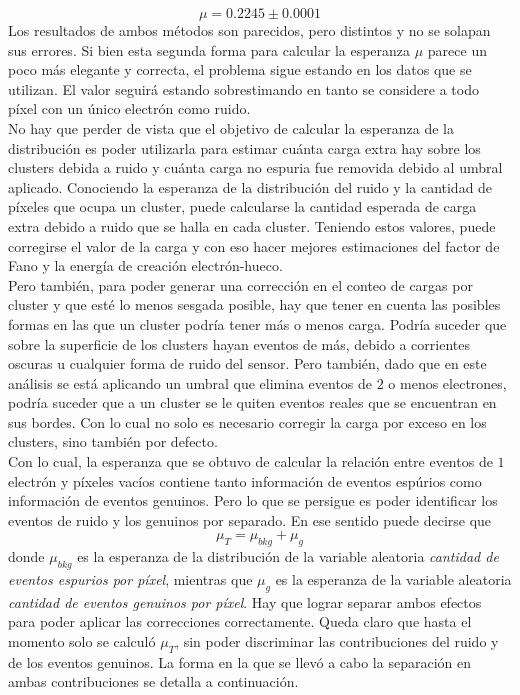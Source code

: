 \begin{equation*}
    \mu = 0.2245 \pm 0.0001
\end{equation*}
Los resultados de ambos métodos son parecidos, pero distintos y no se solapan sus errores. Si bien esta segunda forma para calcular la esperanza $\mu$ parece un poco más elegante y correcta, el problema sigue estando en los datos que se utilizan. El valor seguirá estando sobrestimando en tanto se considere a todo píxel con un único electrón como ruido.\\
\indent No hay que perder de vista que el objetivo de calcular la esperanza de la distribución es poder utilizarla para estimar cuánta carga extra hay sobre los clusters debida a ruido y cuánta carga no espuria fue removida debido al umbral aplicado. Conociendo la esperanza de la distribución del ruido y la cantidad de píxeles que ocupa un cluster, puede calcularse la cantidad esperada de carga extra debido a ruido que se halla en cada cluster. Teniendo estos valores, puede corregirse el valor de la carga y con eso hacer mejores estimaciones del factor de Fano y la energía de creación electrón-hueco.\\
\indent Pero también, para poder generar una corrección en el conteo de cargas por cluster y que esté lo menos sesgada posible, hay que tener en cuenta las posibles formas en las que un cluster podría tener más o menos carga. Podría suceder que sobre la superficie de los clusters hayan eventos de más, debido a corrientes oscuras u cualquier forma de ruido del sensor. Pero también, dado que en este análisis se está aplicando un umbral que elimina eventos de $2$ o menos electrones, podría suceder que a un cluster se le quiten eventos reales que se encuentran en sus bordes. Con lo cual no solo es necesario corregir la carga por exceso en los clusters, sino también por defecto.\\
\indent Con lo cual, la esperanza que se obtuvo de calcular la relación entre eventos de $1$ electrón y píxeles vacíos contiene tanto información de eventos espúrios como información de eventos genuinos. Pero lo que se persigue es poder identificar los eventos de ruido y los genuinos por separado. En ese sentido puede decirse que 
\begin{equation*}
    \mu_{T} = \mu_{bkg} + \mu_{g}
\end{equation*}
donde $\mu_{bkg}$ es la esperanza de la distribución de la variable aleatoria \textit{cantidad de eventos espurios por píxel}, mientras que $\mu_{g}$ es la esperanza de la variable aleatoria \textit{cantidad de eventos genuinos por píxel}. Hay que lograr separar ambos efectos para poder aplicar las correcciones correctamente. Queda claro que hasta el momento solo se calculó $\mu_{T}$, sin poder discriminar las contribuciones del ruido y de los eventos genuinos. La forma en la que se llevó a cabo la separación en ambas contribuciones se detalla a continuación.

